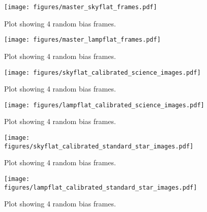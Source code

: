 \documentclass{aastex631}
\begin{document}
\begin{figure}[ht!]
    \begin{centering}
        \texttt{[image: figures/master\_skyflat\_frames.pdf]}
        \caption{
            Plot showing 4 random bias frames.
        }
        \label{fig:master_dark}
    \end{centering}
\end{figure}

\begin{figure}[ht!]
    \begin{centering}
        \texttt{[image: figures/master\_lampflat\_frames.pdf]}
        \caption{
            Plot showing 4 random bias frames.
        }
        \label{fig:master_dark}
    \end{centering}
\end{figure}

\begin{figure}[ht!]
    \begin{centering}
        \texttt{[image: figures/skyflat\_calibrated\_science\_images.pdf]}
        \caption{
            Plot showing 4 random bias frames.
        }
        \label{fig:master_dark}
    \end{centering}
\end{figure}

\begin{figure}[ht!]
    \begin{centering}
        \texttt{[image: figures/lampflat\_calibrated\_science\_images.pdf]}
        \caption{
            Plot showing 4 random bias frames.
        }
        \label{fig:master_dark}
    \end{centering}
\end{figure}

\begin{figure}[ht!]
    \begin{centering}
        \texttt{[image: figures/skyflat\_calibrated\_standard\_star\_images.pdf]}
        \caption{
            Plot showing 4 random bias frames.
        }
        \label{fig:master_dark}
    \end{centering}
\end{figure}

\begin{figure}[ht!]
    \begin{centering}
        \texttt{[image: figures/lampflat\_calibrated\_standard\_star\_images.pdf]}
        \caption{
            Plot showing 4 random bias frames.
        }
        \label{fig:master_dark}
    \end{centering}
\end{figure}



\end{document}
